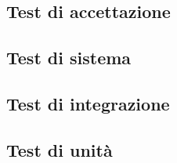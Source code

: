 \subsection{Test di accettazione}

\subsection{Test di sistema}

\subsection{Test di integrazione}

\subsection{Test di unità}

